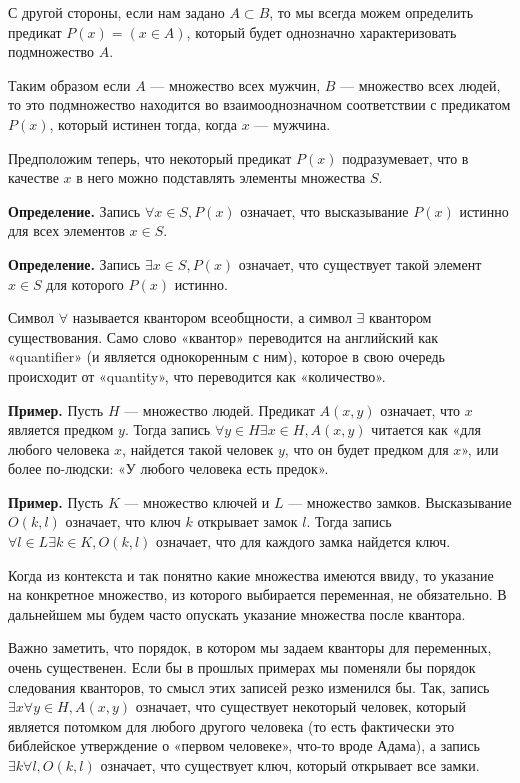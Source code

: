 С другой стороны, если нам задано $A \subset B$, то мы всегда можем определить предикат $P(x) = (x\in A)$, который будет однозначно характеризовать подмножество $A$.

Таким образом если $A$ — множество всех мужчин, $B$ — множество всех людей, то это подмножество находится во взаимооднозначном соответствии с предикатом $P(x)$, который истинен тогда, когда $x$ — мужчина.

Предположим теперь, что некоторый предикат $P(x)$ подразумевает, что в качестве $x$ в него можно подставлять элементы множества $S$.

{\bfseries Определение.} Запись $\forall x\in S, P(x)$ означает, что высказывание $P(x)$ истинно для всех элементов $x \in S$.

{\bfseries Определение.} Запись $\exists x\in S, P(x)$ означает, что существует такой элемент $x\in S$ для которого $P(x)$ истинно.

Символ $\forall$ называется квантором всеобщности, а символ $\exists$ квантором существования.  Само слово «квантор» переводится на английский как «quantifier» (и является однокоренным с ним), которое в свою очередь происходит от «quantity», что переводится как «количество».

{\bfseries Пример.} Пусть $H$ — множество людей. Предикат $A(x, y)$ означает, что $x$ является предком $y$. Тогда запись $\forall y\in H \exists x \in H, A(x, y)$ читается как «для любого человека $x$, найдется такой человек $y$, что он будет предком для $x$», или более по-людски: «У любого человека есть предок».

{\bfseries Пример.} Пусть $K$ — множество ключей и $L$ — множество замков. Высказывание $O(k, l)$ означает, что ключ $k$ открывает замок $l$. Тогда запись $\forall l\in L \exists k \in K, O(k, l)$ означает, что для каждого замка найдется ключ.

Когда из контекста и так понятно какие множества имеются ввиду, то указание на конкретное множество, из которого выбирается переменная, не обязательно. В дальнейшем мы будем часто опускать указание множества после квантора.

Важно заметить, что порядок, в котором мы задаем кванторы для переменных, очень существенен. Если бы в прошлых примерах мы поменяли бы порядок следования кванторов, то смысл этих записей резко изменился бы. Так, запись $\exists x \forall y \in H, A(x, y)$ означает, что существует некоторый человек, который является потомком для любого другого человека (то есть фактически это библейское утверждение о «первом человеке», что-то вроде Адама), а запись $\exists k \forall l, O(k, l)$ означает, что существует ключ, который открывает все замки.


